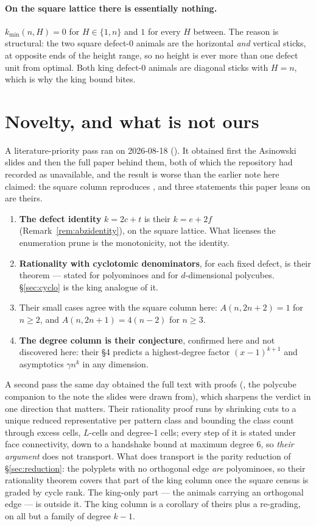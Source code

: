 \documentclass[11pt]{article}
\begin{document}
\paragraph{On the square lattice there is essentially nothing.}
$k_{\min}(n,H) = 0$ for $H \in \{1, n\}$ and $1$ for every $H$ between. The
reason is structural: the two square defect-$0$ animals are the horizontal
\emph{and} vertical sticks, at opposite ends of the height range, so no height is
ever more than one defect unit from optimal. Both king defect-$0$ animals are
diagonal sticks with $H = n$, which is why the king bound bites.


\section{Novelty, and what is not ours}
\label{sec:novelty}

A literature-priority pass ran on 2026-08-18
(). It obtained first the Asinowski
slides and then the full paper behind them, both of which the repository had
recorded as unavailable, and the result is worse than the earlier note here
claimed: the square column reproduces \cite{abz2018}, and three statements
this paper leans on are theirs.

\begin{enumerate}
\item \textbf{The defect identity} $k = 2c + t$ is their $k = e + 2f$
  (Remark~\ref{rem:abzidentity}), on the square lattice. What licenses the
  enumeration prune is the monotonicity, not the identity.
\item \textbf{Rationality with cyclotomic denominators}, for each fixed defect,
  is their theorem --- stated for polyominoes and for $d$-dimensional polycubes.
  \S\ref{sec:cyclo} is the king analogue of it.
\item Their small cases agree with the square column here: $A(n,2n+2) = 1$ for
  $n \ge 2$, and $A(n,2n+1) = 4(n-2)$ for $n \ge 3$.
\item \textbf{The degree column is their conjecture}, confirmed here and not
  discovered here: their \S4 predicts a highest-degree factor $(x-1)^{k+1}$
  and asymptotics $\gamma n^k$ in any dimension.
\end{enumerate}

A second pass the same day obtained the full text with proofs
(\cite{abz2018}, the polycube companion to the note the slides were drawn
from), which sharpens the verdict in one direction that matters. Their
rationality proof runs by shrinking cuts to a unique reduced representative per
pattern class and bounding the class count through excess cells, $L$-cells and
degree-1 cells; every step of it is stated under face connectivity, down to a
handshake bound at maximum degree $6$, so \emph{their argument} does not
transport. What does transport is the parity reduction of
\S\ref{sec:reduction}: the polyplets with no orthogonal edge \emph{are}
polyominoes, so their rationality theorem covers that part of the king column
once the square census is graded by cycle rank. The king-only part --- the
animals carrying an orthogonal edge --- is outside it. The king column is a
corollary of theirs plus a re-grading, on all but a family of degree $k-1$.
\end{document}
